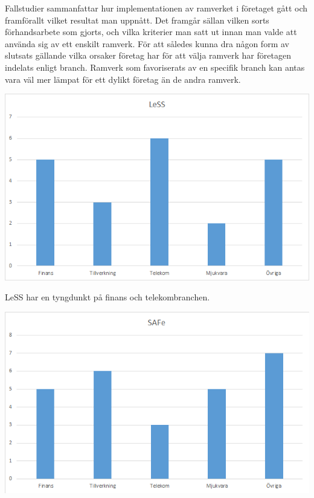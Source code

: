 		Fallstudier sammanfattar hur implementationen av ramverket i företaget gått och framförallt vilket resultat man uppnått. Det framgår sällan vilken sorts förhandsarbete som gjorts, och vilka kriterier man satt ut innan man valde att använda sig av ett enskilt ramverk.
		För att således kunna dra någon form av slutsats gällande vilka orsaker företag har för att välja ramverk har företagen indelats enligt branch.
		Ramverk som favoriserats av en specifik branch kan antas vara väl mer lämpat för ett dylikt företag än de andra ramverk.
	
		
		\begin{center}
			\includegraphics{Grafer/LeSS_brancher.png}
		\end{center}
	
		LeSS har en tyngdunkt på finans och telekombranchen.
			
		\begin{center}
			\includegraphics{Grafer/SAFe_brancher.png}
		\end{center}
				
